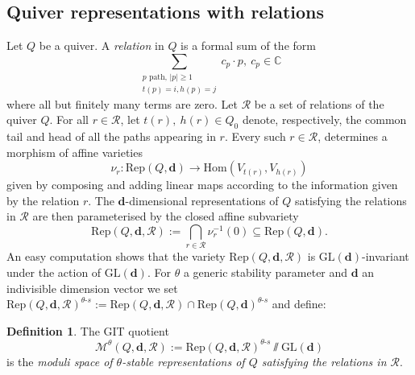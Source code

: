\documentclass{amsart}
\theoremstyle{plain}
\numberwithin{equation}{section}
\theoremstyle{definition}
\newtheorem{definition}[theorem]{Definition}
\theoremstyle{remark}
\begin{document}
	\subsection{Quiver representations with relations}\label{representationsWIthRelations}
	Let $Q$ be a quiver. A \emph{relation} in $Q$ is a formal sum of the form 
	$$
	\sum_{\substack{p\text{ path, }|p|\geq 1\\ t(p)=i,h(p)=j}}c_p\cdot p,\ c_p\in \mathbb{C}
	$$
	where all but finitely many terms are zero. Let $\mathcal{R}$ be a set of relations of the quiver $Q$. For all $r\in \mathcal{R}$, let $t(r),\ h(r)\in Q_0$ denote, respectively, the common tail and head of all the paths appearing in $r$.  Every such $r\in \mathcal{R}$, determines a morphism of affine varieties
	$$
	\nu_r:\text{Rep}(Q,\mathbf{d})\to \text{Hom}(V_{t(r)},V_{h(r)})
	$$
	given by composing and adding linear maps according to the information given by the relation $r$. The $\mathbf{d}$-dimensional representations of $Q$ satisfying the relations in $\mathcal{R}$ are then parameterised by the closed affine subvariety 
	$$
	\text{Rep}(Q,\mathbf{d},\mathcal{R}):=\bigcap_{r\in \mathcal{R}}\nu^{-1}_r(0)\subseteq\text{Rep}(Q,\mathbf{d}).
	$$
	An easy computation shows that the variety $\text{Rep}(Q,\mathbf{d},\mathcal{R})$ is $\text{GL}(\mathbf{d})$-invariant under the action of $\text{GL}(\mathbf{d})$. For $\theta$ a generic stability parameter and $\mathbf{d}$ an indivisible dimension vector we set $\text{Rep}(Q,\mathbf{d},\mathcal{R})^{\theta\text{-}s}:=\text{Rep}(Q,\mathbf{d},\mathcal{R})\cap \text{Rep}(Q,\mathbf{d})^{\theta\text{-}s}$ and define:
	\begin{definition}
		The GIT quotient 
		$$
		\mathcal{M}^{\theta}(Q,\mathbf{d},\mathcal{R}):=\text{Rep}(Q,\mathbf{d},\mathcal{R})^{\theta\text{-}s}\sslash\text{GL}(\mathbf{d})
		$$
		is the \emph{moduli space of $\theta$-stable representations of $Q$ satisfying the relations in $\mathcal{R}$}.
	\end{definition}
\end{document}
